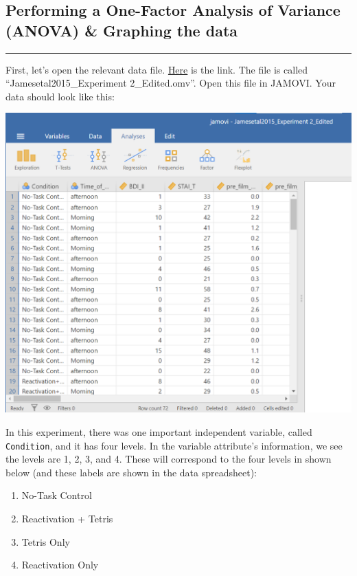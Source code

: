 \documentclass[
]{book}
\providecommand{\tightlist}{%
  \setlength{\itemsep}{0pt}\setlength{\parskip}{0pt}}
\begin{document}
\hypertarget{performing-a-one-factor-analysis-of-variance-anova-graphing-the-data-1}{%
\subsection{Performing a One-Factor Analysis of Variance (ANOVA) \& Graphing the data}\label{performing-a-one-factor-analysis-of-variance-anova-graphing-the-data-1}}

\begin{center}\rule{0.5\linewidth}{0.5pt}\end{center}

First, let's open the relevant data file. \href{https://moodle.stfx.ca/mod/resource/view.php?id=901719}{Here} is the link. The file is called ``Jamesetal2015\_Experiment 2\_Edited.omv''. Open this file in JAMOVI. Your data should look like this:

\includegraphics{img/DataFileLooksLikeThis.png}

In this experiment, there was one important independent variable, called \texttt{Condition}, and it has four levels. In the variable attribute's information, we see the levels are 1, 2, 3, and 4. These will correspond to the four levels in shown below (and these labels are shown in the data spreadsheet):

\begin{enumerate}
\def\labelenumi{\arabic{enumi}.}
\tightlist
\item
  No-Task Control
\item
  Reactivation + Tetris
\item
  Tetris Only
\item
  Reactivation Only
\end{enumerate}
\end{document}
